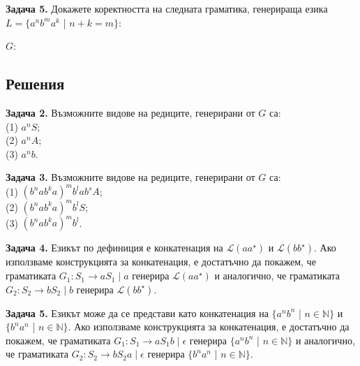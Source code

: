 \documentclass[openany]{book}
\begin{document}
    \vspace{15pt}

    \textbf{Задача 5.} Докажете коректността на следната граматика, генерираща
    езика $L = \{a^nb^ma^k$ | $n+k = m\}$: \\
    \begin{center}
        $G$: 
    \end{center}
\vspace{25pt}

\subsection{Решения}
\textbf{Задача 2.} Възможните видове на редиците, генерирани от $G$ са: \\
(1) $a^nS$; \\
(2) $a^nA$; \\
(3) $a^nb$.

\vspace{15pt} 

\textbf{Задача 3.} Възможните видове на редиците, генерирани от $G$ са: \\
(1) $(b^nab^ka)^mb^lab^sA$; \\
(2) $(b^nab^ka)^mb^lS$; \\
(3) $(b^nab^ka)^mb^l$. \\

\vspace{15pt}

\textbf{Задача 4.} Езикът по дефиниция е конкатенация на $\mathscr{L}(aa^{\star})$
и $\mathscr{L}(bb^{\star})$. Ако използваме конструкцията за конкатенация, е достатъчно
да покажем, че граматиката $G_1 : \boxed{S_1 \rightarrow aS_1 \; | \; a}$ генерира
$\mathscr{L}(aa^{\star})$ и аналогично, че граматиката $G_2 : \boxed{S_2 \rightarrow bS_2 \; | \; b}$
генерира $\mathscr{L}(bb^{\star})$.

\vspace{15pt}

\textbf{Задача 5.} 
Езикът може да се представи като конкатенация на $\{a^nb^n$ | $n \in \mathbb{N}\}$
и $\{b^na^n$ | $n \in \mathbb{N}\}$. Ако използваме конструкцията за конкатенация, е достатъчно
да покажем, че граматиката $G_1 : \boxed{S_1 \rightarrow aS_1b \; | \; \epsilon }$ генерира
$\{a^nb^n$ | $n \in \mathbb{N}\}$ и аналогично, че граматиката $G_2 : \boxed{S_2 \rightarrow bS_2a \; | \; \epsilon}$
генерира $\{b^na^n$ | $n \in \mathbb{N}\}$.
\end{document}
